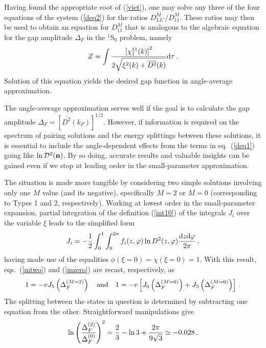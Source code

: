 Having found the appropriate root of (\ref{viet}), one may solve
any three of the four equations of the system (\ref{deq2})
for the ratios $D_{LL'}^M/D_{11}^M$.  These ratios may then be
used to obtain an equation for $D_{11}^M$ that is analogous to
the algebraic equation for the gap amplitude $\Delta_F$ in
the $^1$S$_0$ problem, namely
\begin{equation}
Z = \int
\frac
{{[\chi^{11}_1(k)]}^2}
{2\sqrt{\xi^2(k) + {\overline{D^2}}(k)}} {\rm d}\tau\, .
\end{equation}
Solution of this equation yields the desired gap function in
angle-average approximation.

The angle-average approximation serves well if the goal is to calculate
the gap amplitude $\Delta_F = [{\overline{D^2}}(k_F)]^{1/2}$.  However,
if information is required on the spectrum of pairing solutions
and the energy splittings between these solutions, it is essential
to include the angle-dependent effects from the terms in eq.~(\ref{deq1})
going like $\ln{\cal D}^2({\bf n}) $.  By so doing, accurate
results and valuable insights can be gained even if we stop at
leading order in the small-parameter approximation.

The situation is made more tangible by considering two simple
solutions involving only one $M$ value (and its negative), specifically
$M=2$ or $M=0$ (corresponding to Types 1 and 2, respectively).
Working at lowest order in the small-parameter expansion,
partial integration of the definition (\ref{int10}) of the integrals
$J_i$ over the variable $\xi$ leads to the simplified
form
\begin{equation}
J_i=-{1\over 2}\int_0^1\int_0^{2\pi}f_i(z,\varphi)\ln D^2(z,\varphi)
{{\rm d}z{\rm d} \varphi\over 2\pi} \, ,
\label{jexp}
\end{equation}
having made use of the equalities $\phi(\xi=0)=\chi(\xi=0)=1$.
With this result, eqs.~(\ref{mtwo}) and (\ref{mzero}) are recast,
respectively, as
\begin{equation}
1=-vJ_5\left(\Delta_F^{(M=2)}\right) \quad {\rm and}
\quad 1=-v\left[J_0\left(\Delta_F^{(M=0)}\right)
+J_5\left(\Delta_F^{(M=0)}\right)\right] \, .
\end{equation}
The splitting between the states in question is determined by subtracting
one equation from the other.  Straightforward manipulations give
\begin{equation}
\ln\left({\Delta_F^{(2)}\over \Delta_F^{(0)}}\right)^2
={2\over 3}-\ln 3+{2\pi\over 9\sqrt{3}}\simeq -0.028 \, .
\label{ratio}
\end{equation}


